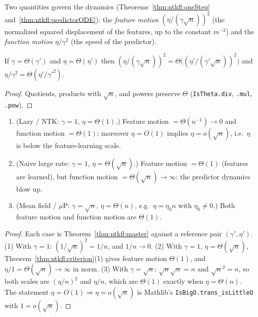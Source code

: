 Two quantities govern the dynamics (Theorems~\ref{thm:ntkfl:oneStep} and~\ref{thm:ntkfl:predictorODE}): the \emph{feature motion} $(\eta/(\gamma\sqrt n))^2$ (the normalized
squared displacement of the features, up to the constant $m^{-2}$) and the \emph{function motion} $\eta/\gamma^2$ (the speed of the predictor).

\begin{theorem}\label{thm:ntkfl:master}
  \leanok
If $\gamma=\Theta(\gamma')$ and $\eta=\Theta(\eta')$ then $(\eta/(\gamma\sqrt n))^2=\Theta\bigl((\eta'/(\gamma'\sqrt n))^2\bigr)$ and $\eta/\gamma^2=\Theta(\eta'/\gamma'^2)$.
\end{theorem}

\begin{proof}
  \leanok
Quotients, products with $\sqrt n$, and powers preserve $\Theta$ (\texttt{IsTheta.div}, \texttt{.mul}, \texttt{.pow}).
\end{proof}

\begin{theorem}\label{thm:ntkfl:regimes}
  \leanok
\begin{enumerate}
  \item (Lazy / NTK: $\gamma=1$, $\eta=\Theta(1)$.) Feature motion $=\Theta(n^{-1})\to0$ and function motion $=\Theta(1)$; moreover $\eta=O(1)$ implies $\eta=o(\sqrt n)$, i.e.\ $\eta$ is below the feature-learning scale.
  \item (Naive large rate: $\gamma=1$, $\eta=\Theta(\sqrt n)$.) Feature motion $=\Theta(1)$ (features are learned), but function motion $=\Theta(\sqrt n)\to\infty$: the predictor dynamics blow up.
  \item (Mean field / $\mu$P: $\gamma=\sqrt n$, $\eta=\Theta(n)$, e.g.\ $\eta=\eta_0n$ with $\eta_0\ne0$.) Both feature motion and function motion are $\Theta(1)$.
\end{enumerate}
\end{theorem}

\begin{proof}
  \leanok
Each case is Theorem~\ref{thm:ntkfl:master} against a reference pair $(\gamma',\eta')$. (1) With $\gamma=1$: $(1/\sqrt n)^2=1/n$, and $1/n\to0$. (2) With $\gamma=1$, $\eta=\Theta(\sqrt n)$, Theorem~\ref{thm:ntkfl:criterion}(1) gives feature motion $\Theta(1)$, and $\eta/1=\Theta(\sqrt n)\to\infty$ in norm. (3) With $\gamma=\sqrt n$:
$\sqrt n\sqrt n=n$ and $\sqrt n^2=n$, so both scales are $(\eta/n)^2$ and $\eta/n$, which are $\Theta(1)$ exactly when $\eta=\Theta(n)$.
The statement $\eta=O(1)\Rightarrow\eta=o(\sqrt n)$ is Mathlib's \texttt{IsBigO.trans\_isLittleO} with $1=o(\sqrt n)$.
\end{proof}

